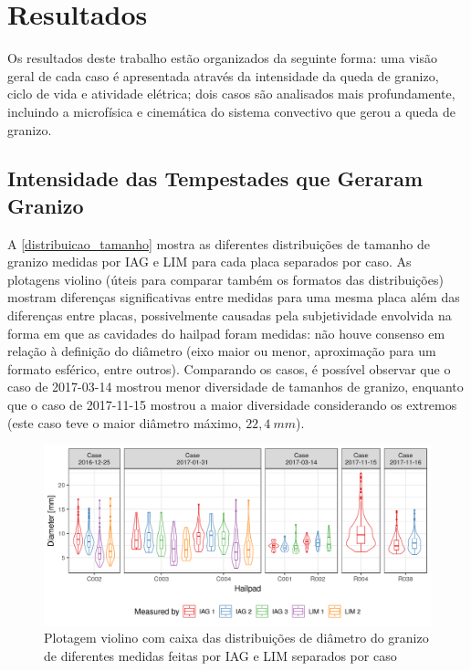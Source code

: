 \chapter{Resultados}\label{resultados}

Os resultados deste trabalho estão organizados da seguinte forma: uma visão geral de cada caso é apresentada através da intensidade da queda de granizo, ciclo de vida e atividade elétrica; dois casos são analisados mais profundamente, incluindo a microfísica e cinemática do sistema convectivo que gerou a queda de granizo.

\section{Intensidade das Tempestades que Geraram Granizo}\label{ciclo_vida}

A \autoref{distribuicao_tamanho} mostra as diferentes distribuições de tamanho de granizo medidas por IAG e LIM para cada placa separados por caso. As plotagens violino (úteis para comparar também os formatos das distribuições) mostram diferenças significativas entre medidas para uma mesma placa além das diferenças entre placas, possivelmente causadas pela subjetividade envolvida na forma em que as cavidades do hailpad foram medidas: não houve consenso em relação à definição do diâmetro (eixo maior ou menor, aproximação para um formato esférico, entre outros). Comparando os casos, é possível observar que o caso de 2017-03-14 mostrou menor diversidade de tamanhos de granizo, enquanto que o caso de 2017-11-15 mostrou a maior diversidade considerando os extremos (este caso teve o maior diâmetro máximo, $22,4\:mm$).

\begin{figure}[hbt]
	\begin{center}
		\caption{Plotagem violino com caixa das distribuições de diâmetro do granizo de diferentes medidas feitas por IAG e LIM separados por caso} 
		\label{distribuicao_tamanho}
		\includegraphics[width=\columnwidth]{../Hailpads_Processing/figures/measures_distribution.png}
	\end{center}
\end{figure}

